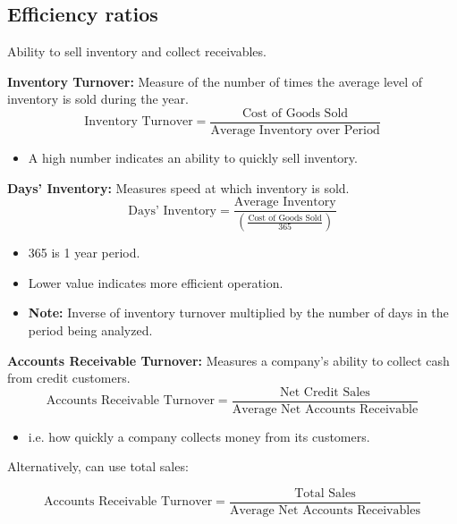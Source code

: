 \subsection{Efficiency ratios}
\begin{definition} Ability to sell inventory and collect receivables.

    \textbf{Inventory Turnover:} Measure of the number of times the average level of inventory is sold during the year.
    \begin{equation}
        \text{Inventory Turnover} = \frac{\text{Cost of Goods Sold}}{\text{Average Inventory over Period}}
    \end{equation}
    \begin{itemize}
        \item A high number indicates an ability to quickly sell inventory.
    \end{itemize}
    \vspace{1em}

    \textbf{Days' Inventory:} Measures speed at which inventory is sold.
    \begin{equation}
        \text{Days' Inventory} = \frac{\text{Average Inventory}}{\left(\frac{\text{Cost of Goods Sold}}{365}\right)}
    \end{equation}
    \begin{itemize}
        \item 365 is 1 year period.
        \item Lower value indicates more efficient operation.
        \item \textbf{Note:} Inverse of inventory turnover multiplied by the number of days in the period being analyzed.
    \end{itemize}
    \vspace{1em}

    \textbf{Accounts Receivable Turnover:} Measures a company's ability to collect cash from credit customers.
    \begin{equation}
        \text{Accounts Receivable Turnover} = \frac{\text{Net Credit Sales}}{\text{Average Net Accounts Receivable}}
    \end{equation}
    \begin{itemize}
        \item i.e. how quickly a company collects money from its customers.
    \end{itemize}
    
    Alternatively, can use total sales:

    \begin{equation}
        \text{Accounts Receivable Turnover} = \frac{\text{Total Sales}}{\text{Average Net Accounts Receivables}}
    \end{equation}
    \vspace{1em}


\end{definition}
